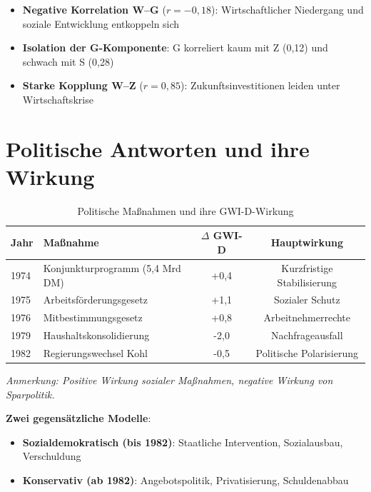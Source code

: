 \begin{itemize}
    \item \textbf{Negative Korrelation W–G} (\(r = -0,18\)): Wirtschaftlicher Niedergang und soziale Entwicklung entkoppeln sich
    \item \textbf{Isolation der G-Komponente}: G korreliert kaum mit Z (0,12) und schwach mit S (0,28)
    \item \textbf{Starke Kopplung W–Z} (\(r = 0,85\)): Zukunftsinvestitionen leiden unter Wirtschaftskrise
\end{itemize}

\section{Politische Antworten und ihre Wirkung}

\begin{table}[ht]
    \centering
    \caption{Politische Maßnahmen und ihre GWI-D-Wirkung}
    \label{tab:politik_stagflation}
    \begin{tabular}{llcc}
        \toprule
        \textbf{Jahr} & \textbf{Maßnahme} & \textbf{$\Delta$ GWI-D} & \textbf{Hauptwirkung} \\
        \midrule
        1974 & Konjunkturprogramm (5,4 Mrd DM) & +0,4 & Kurzfristige Stabilisierung \\
        1975 & Arbeitsförderungsgesetz & +1,1 & Sozialer Schutz \\
        1976 & Mitbestimmungsgesetz & +0,8 & Arbeitnehmerrechte \\
        1979 & Haushaltskonsolidierung & -2,0 & Nachfrageausfall \\
        1982 & Regierungswechsel Kohl & -0,5 & Politische Polarisierung \\
        \bottomrule
    \end{tabular}
\end{table}

\begin{flushleft}
\footnotesize{\textit{Anmerkung: Positive Wirkung sozialer Maßnahmen, negative Wirkung von Sparpolitik.}}
\end{flushleft}

\textbf{Zwei gegensätzliche Modelle}:
\begin{itemize}
    \item \textbf{Sozialdemokratisch (bis 1982)}: Staatliche Intervention, Sozialausbau, Verschuldung
    \item \textbf{Konservativ (ab 1982)}: Angebotspolitik, Privatisierung, Schuldenabbau
\end{itemize}

